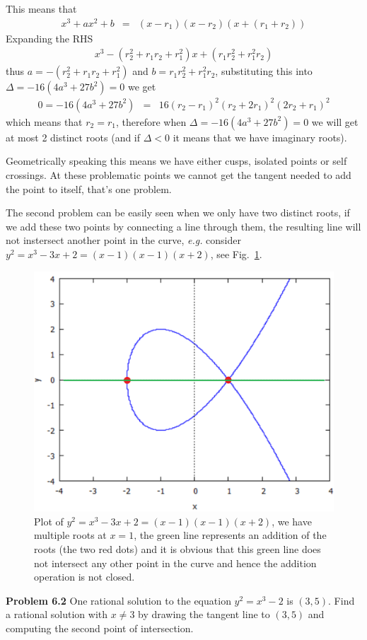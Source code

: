 \documentclass[aps,preprint,preprintnumbers,nofootinbib,showpacs,prd]{revtex4-1}
\newcommand{\eg}{{\it e.g.} }
\newcommand{\nbea}{\begin{eqnarray*}}
\newcommand{\neea}{\end{eqnarray*}}
\begin{document}
This means that
%
\nbea
x^3 + ax^2 + b & = & (x-r_1)(x-r_2)(x+(r_1+r_2))
\neea
%
Expanding the RHS
%
\nbea
x^3-(r_2^2+r_1r_2+r_1^2)x+(r_1r_2^2+r_1^2r_2)
\neea
%
thus $a = -(r_2^2+r_1r_2+r_1^2)$ and $b = r_1r_2^2+r_1^2r_2$, substituting this into $\Delta = -16(4a^3 +27b^2 ) = 0$ we get
%
\nbea
0 = -16(4a^3 +27b^2) & = & 16(r_2-r_1)^2(r_2+2r_1)^2(2r_2+r_1)^2
\neea
%
which means that $r_2 = r_1$, therefore when $\Delta = -16(4a^3 +27b^2 ) = 0$ we will get at most 2 distinct roots (and if $\Delta < 0$ it means that we have imaginary roots).

Geometrically speaking this means we have either cusps, isolated points or self crossings. At these problematic points we cannot get the tangent needed to add the point to itself, that's one problem.

The second problem can be easily seen when we only have two distinct roots, if we add these two points by connecting a line through them, the resulting line will not instersect another point in the curve, \eg consider $y^2 = x^3-3x+2 = (x-1)(x-1)(x+2)$, see Fig.~\ref{fig:singular-curve}.
%
\begin{figure}
\centering
  \includegraphics[width=.55\linewidth]{singular_curve.png}
  \caption{Plot of $y^2 = x^3-3x+2 = (x-1)(x-1)(x+2)$, we have multiple roots at $x=1$, the green line represents an addition of the roots (the two red dots) and it is obvious that this green line does not intersect any other point in the curve and hence the addition operation is not closed.}
\label{fig:singular-curve}
\end{figure}
%

{\bf Problem 6.2} One rational solution to the equation $y^2 = x^3 − 2$ is $(3, 5)$. Find a rational solution with $x \neq 3$ by drawing the tangent line to $(3, 5)$ and computing the second point of intersection.
\end{document}
